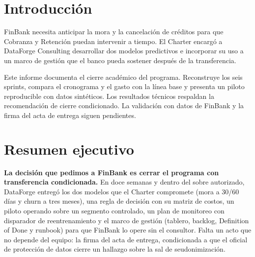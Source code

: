 \documentclass[10pt,a4paper]{article}
\begin{document}
\section*{Introducción}

FinBank necesita anticipar la mora y la cancelación de créditos para que Cobranza y Retención puedan intervenir a tiempo. El Charter encargó a DataForge Consulting desarrollar dos modelos predictivos e incorporar su uso a un marco de gestión que el banco pueda sostener después de la transferencia.

Este informe documenta el cierre académico del programa. Reconstruye los seis sprints, compara el cronograma y el gasto con la línea base y presenta un piloto reproducible con datos sintéticos. Los resultados técnicos respaldan la recomendación de cierre condicionado. La validación con datos de FinBank y la firma del acta de entrega siguen pendientes.

\section{Resumen ejecutivo}

\textbf{La decisión que pedimos a FinBank es cerrar el programa con transferencia condicionada.} En doce semanas y dentro del sobre autorizado, DataForge entregó los dos modelos que el Charter compromete (mora a 30/60 días y churn a tres meses), una regla de decisión con su matriz de costos, un piloto operando sobre un segmento controlado, un plan de monitoreo con disparador de reentrenamiento y el marco de gestión (tablero, backlog, Definition of Done y runbook) para que FinBank lo opere sin el consultor. Falta un acto que no depende del equipo: la firma del acta de entrega, condicionada a que el oficial de protección de datos cierre un hallazgo sobre la sal de seudonimización.
\end{document}
